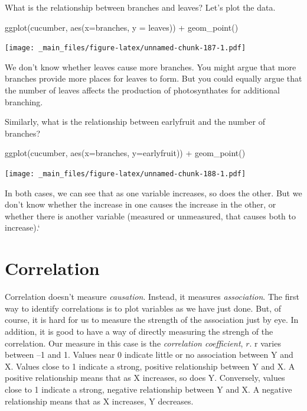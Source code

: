 \documentclass[
]{book}
\newenvironment{Shaded}{\begin{snugshade}}{\end{snugshade}}
\newcommand{\AttributeTok}[1]{\textcolor[rgb]{0.77,0.63,0.00}{#1}}
\newcommand{\FunctionTok}[1]{\textcolor[rgb]{0.00,0.00,0.00}{#1}}
\newcommand{\NormalTok}[1]{#1}
\newcommand{\SpecialCharTok}[1]{\textcolor[rgb]{0.00,0.00,0.00}{#1}}
\begin{document}
What is the relationship between branches and leaves? Let's plot the data.

\begin{Shaded}
\begin{Highlighting}[]
\FunctionTok{ggplot}\NormalTok{(cucumber, }\FunctionTok{aes}\NormalTok{(}\AttributeTok{x=}\NormalTok{branches, }\AttributeTok{y =}\NormalTok{ leaves)) }\SpecialCharTok{+}
  \FunctionTok{geom\_point}\NormalTok{()}
\end{Highlighting}
\end{Shaded}

\texttt{[image: \_main\_files/figure-latex/unnamed-chunk-187-1.pdf]}

We don't know whether leaves cause more branches. You might argue that more branches provide more places for leaves to form. But you could equally argue that the number of leaves affects the production of photosynthates for additional branching.

Similarly, what is the relationship between earlyfruit and the number of branches?

\begin{Shaded}
\begin{Highlighting}[]
\FunctionTok{ggplot}\NormalTok{(cucumber, }\FunctionTok{aes}\NormalTok{(}\AttributeTok{x=}\NormalTok{branches, }\AttributeTok{y=}\NormalTok{earlyfruit)) }\SpecialCharTok{+}
  \FunctionTok{geom\_point}\NormalTok{()}
\end{Highlighting}
\end{Shaded}

\texttt{[image: \_main\_files/figure-latex/unnamed-chunk-188-1.pdf]}

In both cases, we can see that as one variable increases, so does the other. But we don't know whether the increase in one causes the increase in the other, or whether there is another variable (measured or unmeasured, that causes both to increase).`

\hypertarget{correlation-1}{%
\section{Correlation}\label{correlation-1}}

Correlation doesn't measure \emph{causation}. Instead, it measures \emph{association}. The first way to identify correlations is to plot variables as we have just done. But, of course, it is hard for us to measure the strength of the association just by eye. In addition, it is good to have a way of directly measuring the strengh of the correlation. Our measure in this case is the \emph{correlation coefficient}, \(r\). r varies between --1 and 1. Values near 0 indicate little or no association between Y and X. Values close to 1 indicate a strong, positive relationship between Y and X. A positive relationship means that as X increases, so does Y. Conversely, values close to 1 indicate a strong, negative relationship between Y and X. A negative relationship means that as X increases, Y decreases.
\end{document}
